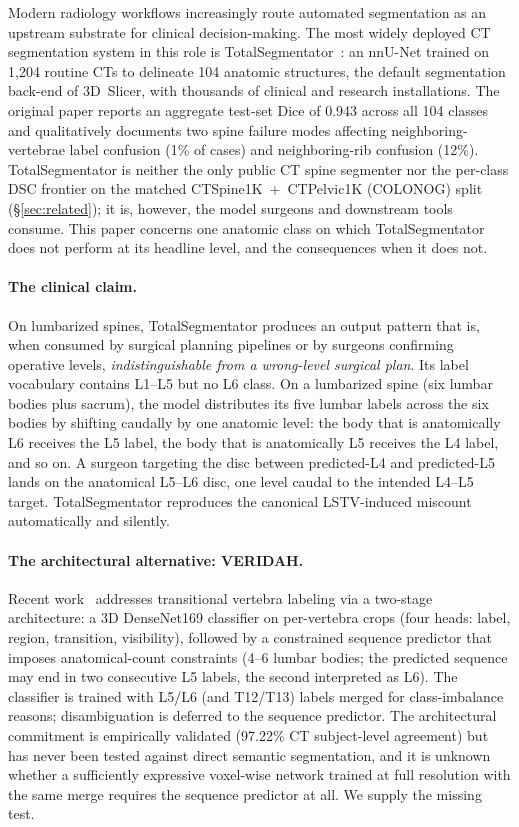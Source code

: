 \documentclass{article}
\newcommand{\TS}{TotalSegmentator}
\newcommand{\SOTA}{TotalSegmentator}
\newcommand{\VERIDAH}{VERIDAH}
\begin{document}
Modern radiology workflows increasingly route automated
segmentation as an upstream substrate for clinical
decision-making. The most widely deployed CT segmentation
system in this role is
\TS{}~\citep{Wasserthal2023TotalSegmentator:Images}: an
nnU-Net trained on 1{,}204 routine CTs to delineate 104
anatomic structures, the default segmentation back-end of
3D~Slicer, with thousands of clinical and research
installations. The original paper reports an aggregate
test-set Dice of 0.943 across all 104 classes and
qualitatively documents two spine failure modes
affecting neighboring-vertebrae label confusion (1\%
of cases) and neighboring-rib confusion (12\%). \TS{} is neither the
only public CT spine segmenter nor the per-class DSC
frontier on the matched CTSpine1K~+~CTPelvic1K (COLONOG)
split (\S\ref{sec:related}); it is, however, the model
surgeons and downstream tools consume. This paper
concerns one anatomic class on which \TS{} does not
perform at its headline level, and the consequences
when it does not.

\paragraph{The clinical claim.}
On lumbarized spines, \SOTA{} produces an output pattern
that is, when consumed by surgical planning pipelines or by
surgeons confirming operative levels, \emph{indistinguishable
from a wrong-level surgical plan}. Its label vocabulary
contains L1--L5 but no L6 class. On a lumbarized spine (six
lumbar bodies plus sacrum), the model distributes its five
lumbar labels across the six bodies by shifting caudally by
one anatomic level: the body that is anatomically L6
receives the L5 label, the body that is anatomically L5
receives the L4 label, and so on. A surgeon targeting the
disc between predicted-L4 and predicted-L5 lands on the
anatomical L5--L6 disc, one level caudal to the intended
L4--L5 target. \SOTA{} reproduces the canonical
LSTV-induced miscount automatically and silently.

\paragraph{The architectural alternative: \VERIDAH{}.}
Recent work~\citep{Moller2026VERIDAH:Sequences} addresses
transitional vertebra labeling via a two-stage
architecture: a 3D DenseNet169 classifier on per-vertebra
crops (four heads: label, region, transition, visibility),
followed by a constrained sequence predictor that imposes
anatomical-count constraints (4--6 lumbar bodies; the
predicted sequence may end in two consecutive L5 labels,
the second interpreted as L6). The classifier is trained
with L5/L6 (and T12/T13) labels merged for class-imbalance
reasons; disambiguation is deferred to the sequence
predictor. The architectural commitment is empirically
validated (97.22\% CT subject-level agreement) but has
never been tested against direct semantic segmentation,
and it is unknown whether a sufficiently expressive
voxel-wise network trained at full resolution with the
same merge requires the sequence predictor at all. We
supply the missing test.
\end{document}
